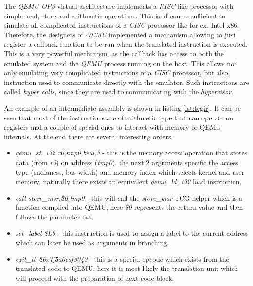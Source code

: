 The \textit{QEMU OPS} virtual architecture implements a \textit{RISC} like processor with simple load, store and arithmetic operations. This is of course sufficient to simulate all  complicated instructions of a \textit{CISC} processor like for ex. Intel x86. Therefore, the designers of \textit{QEMU} implemented a mechanism allowing to just register a callback function to be run when the translated instruction is executed. This is a very powerful mechanism, as the callback has access to both the emulated system and the \textit{QEMU} process running on the host. This allows not only emulating very complicated instructions of a \textit{CISC} processor, but also instruction used to communicate directly with the emulator. Such instructions are called \textit{hyper calls}, since they are used to communicating with the \textit{hypervisor}.

An example of an intermediate assembly is shown in listing \ref{lst:tcgir}. It can be seen that most of the instructions are of arithmetic type that can operate on registers and a couple of special ones to interact with memory or QEMU internals. At the end there are several interesting orders:
\begin{itemize}
    \item \textit{qemu\_st\_i32 r0,tmp0,beul,3} - this is the memory access operation that stores data (from \textit{r0}) on address (\textit{tmp0}), the next 2 arguments specific the access type (endianess, bus width) and memory index which selects kernel and user memory, naturally there exists an equivalent \textit{qemu\_ld\_i32} load instruction,
    \item \textit{call        store\_msr,\$0,tmp0} - this will call the \textit{store\_msr} TCG helper which is a function complied into QEMU, here \textit{\$0} represents the return value and then follows the parameter list,
    \item \textit{set\_label   \$L0} - this instruction is used to assign a label to the current address which can later be used as arguments in branching,
    \item \textit{exit\_tb     \$0x7f5a0caf8043} - this is a special opcode which exists from the translated code to QEMU, here it is most likely the translation unit which will proceed with the preparation of next code block.
\end{itemize}


